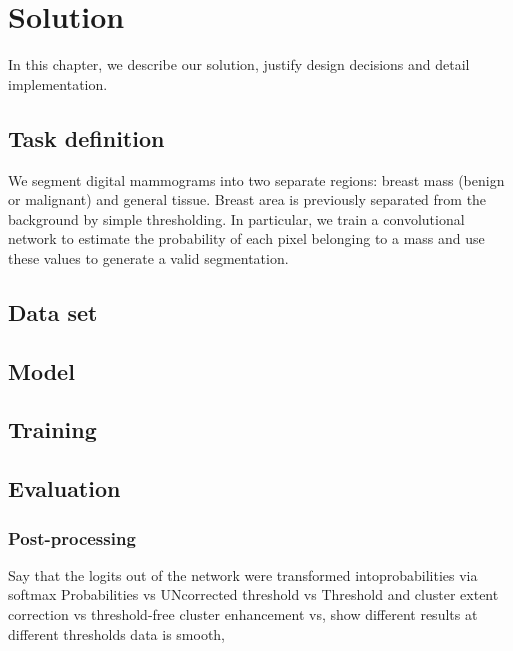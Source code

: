 \chapter{Solution}
\label{ch:Model}

In this chapter, we describe our solution, justify design decisions and detail implementation.



\section{Task definition}
We segment digital mammograms into two separate regions: breast mass (benign or malignant) and general tissue.
Breast area is previously separated from the background by simple thresholding.
In particular, we train a convolutional network to estimate the probability of each pixel belonging to a mass and use these values to generate a valid segmentation.

\section{Data set}


\section{Model}


\section{Training}


\section{Evaluation}


\subsection{Post-processing}
Say that the logits out of the network were transformed intoprobabilities via softmax
Probabilities vs UNcorrected threshold vs Threshold and cluster extent correction vs threshold-free cluster enhancement vs, show different results at different thresholds
data is smooth, 

